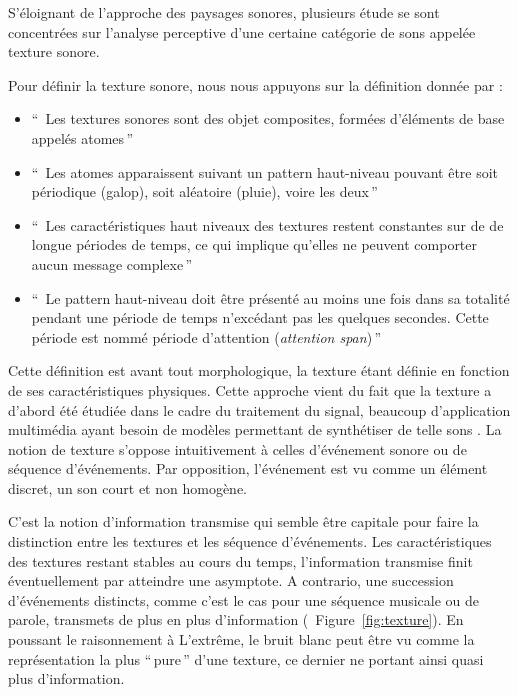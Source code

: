 S'éloignant de l'approche des paysages sonores, plusieurs étude se sont concentrées sur l'analyse perceptive d'une certaine catégorie de sons appelée texture sonore.

Pour définir la texture sonore, nous nous appuyons sur la définition donnée par \citep[p. 25]{saint1995classification}:  

\begin{itemize}
\item ``\, Les textures sonores sont des objet composites, formées d'éléments de base appelés atomes\,''
\item ``\, Les atomes apparaissent suivant un pattern haut-niveau pouvant être soit périodique (galop), soit aléatoire (pluie), voire les deux\,''
\item ``\, Les caractéristiques haut niveaux des textures restent constantes sur de de longue périodes de temps, ce qui implique qu'elles ne peuvent comporter aucun message complexe\,''
\item ``\, Le pattern haut-niveau doit être présenté au moins une fois dans sa totalité pendant une période de temps n’excédant pas les quelques  secondes. Cette période est nommé période d'attention (\emph{attention span})\,''
\end{itemize}

Cette définition est avant tout morphologique, la texture étant définie en fonction de ses caractéristiques physiques. Cette approche vient du fait que la texture a d'abord été étudiée dans le cadre du traitement du signal, beaucoup d'application multimédia ayant besoin de  modèles permettant de synthétiser de telle sons \citep{schwarz2011state}. La notion de texture s'oppose intuitivement à celles d'événement sonore ou de séquence d'événements. Par opposition, l'événement est vu comme un élément discret, un son court et non homogène.

C'est la notion d'information transmise qui semble être capitale pour faire la distinction entre les textures et les séquence d'événements. Les caractéristiques des textures restant stables au cours du temps, l'information transmise finit éventuellement par atteindre une asymptote. A contrario, une succession d'événements distincts, comme c'est le cas pour une séquence musicale ou de parole, transmets de plus en plus d'information (\Cf~Figure~\ref{fig:texture}). En poussant le raisonnement à L’extrême, le bruit blanc peut être vu comme la représentation la plus ``\,pure\,'' d'une texture, ce dernier ne portant ainsi quasi plus d'information.

